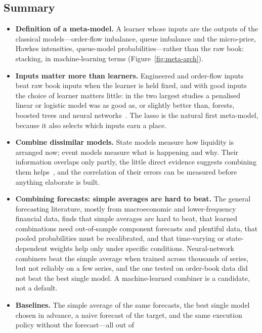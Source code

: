 \subsection{Summary}
\label{sec:meta-summary}

\begin{itemize}[leftmargin=1.5em,itemsep=3pt]
\item \textbf{Definition of a meta-model.} A learner whose inputs are the outputs of the classical models---order-flow
  imbalance, queue imbalance and the micro-price, Hawkes intensities, queue-model probabilities---rather
  than the raw book: stacking, in machine-learning terms (Figure~\ref{fig:meta-arch}).
\item \textbf{Inputs matter more than learners.} Engineered and order-flow inputs beat raw book inputs when the
  learner is held fixed, and with good inputs the choice of learner matters little: in the two largest
  studies a penalised linear or logistic model was as good as, or slightly better than, forests, boosted
  trees and neural networks~\citep{aitsahalia2026,easley2021}. The lasso is the natural first meta-model,
  because it also selects which inputs earn a place.
\item \textbf{Combine dissimilar models.} State models measure how liquidity is arranged now; event models
  measure what is happening and why. Their information overlaps only partly, the little direct evidence
  suggests combining them helps~\citep{munitoke2020ratio,zhanglimzohren2021mbo}, and the correlation of
  their errors can be measured before anything elaborate is built.
\item \textbf{Combining forecasts: simple averages are hard to beat.} The general forecasting
  literature, mostly from macroeconomic and lower-frequency financial data, finds that simple averages are
  hard to beat, that learned combinations need out-of-sample component forecasts and plentiful data, that
  pooled probabilities must be recalibrated, and that time-varying or state-dependent weights help only
  under specific conditions. Neural-network combiners beat the simple average when trained across
  thousands of series, but not reliably on a few series, and the one tested on order-book data did not beat
  the best single model. A machine-learned combiner is a candidate, not a default.
\item \textbf{Baselines.} The simple average of the same forecasts, the best single model chosen in
  advance, a naive forecast of the target, and the same execution policy without the forecast---all out of

\end{itemize}
